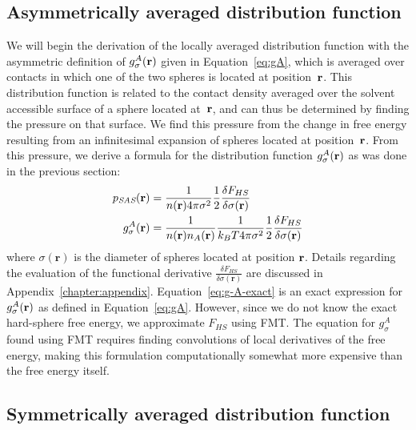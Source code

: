 \subsection{Asymmetrically averaged distribution function}\label{sec:g-A}

We will begin the derivation of the locally averaged distribution
function with the asymmetric definition of $g_\sigma^A(\textbf{r})$ given in
Equation~\ref{eq:gA}, which is averaged over contacts in which one of
the two spheres is located at position~$\textbf{r}$.  This distribution
function is related to the contact density averaged over the solvent
accessible surface of a sphere located at~$\textbf{r}$, and can thus be
determined by finding the pressure on that surface.  We find this
pressure from the change in free energy resulting from an
infinitesimal expansion of spheres located at position~$\textbf{r}$.  From
this pressure, we derive a formula for the distribution function
$g_\sigma^A(\textbf{r})$ as was done in the previous section:
\begin{align}
  p_{\textit{SAS}}(\mathbf{r}) &= \frac{1}{n(\rr) 4\pi \sigma^2}\frac12 \frac{\delta
    F_{HS}}{\delta \sigma(\mathbf{r})} \label{eq:p_{HS}^A}\\
  g_\sigma^A(\rr)%
  &= \frac{1}{n(\rr) n_A(\rr)}\frac{1}{ k_BT 4\pi \sigma^2}\frac12 \frac{\delta
    F_{HS}}{\delta \sigma(\mathbf{r})} \label{eq:g-A-exact}
\end{align}
where $\sigma(\mathbf{r})$ is the diameter of spheres located at
position $\textbf{r}$.  Details regarding the evaluation of the functional
derivative $\frac{\delta F_{HS}}{\delta \sigma(\mathbf{r})}$ are
discussed in Appendix~\ref{chapter:appendix}.
Equation~\ref{eq:g-A-exact} is an exact expression for
$g_\sigma^A(\textbf{r})$ as defined in Equation~\ref{eq:gA}.  However, since
we do not know the exact hard-sphere free energy, we approximate
$F_{HS}$ using FMT.  The equation for $g_\sigma^A$ found using FMT
requires finding convolutions of local derivatives of the free energy,
making this formulation computationally somewhat more expensive than
the free energy itself.

\derivation{
  \end{widetext}
}

\subsection{Symmetrically averaged distribution function}\label{sec:g-S}

